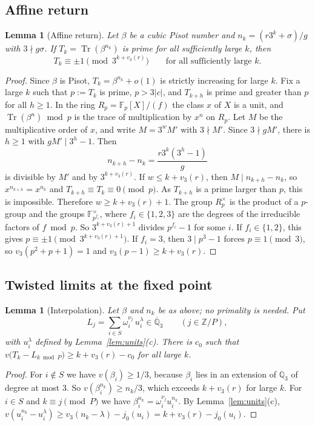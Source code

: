 \documentclass[11pt,a4paper]{article}
\newtheorem{lemma}[theorem]{Lemma}
\theoremstyle{definition}
\theoremstyle{remark}
\newcommand{\Z}{\mathbb{Z}}
\newcommand{\F}{\mathbb{F}}
\newcommand{\Qt}{\mathbb{Q}_3}
\newcommand{\Qtbar}{\overline{\mathbb{Q}}_3}
\DeclareMathOperator{\Tr}{Tr}
\begin{document}
\subsection{Affine return}
\begin{lemma}[Affine return]\label{lem:return}
Let $\beta$ be a cubic Pisot number and $n_k=(r3^k+\sigma)/g$ with $3\nmid g\sigma$.
If $T_k=\Tr(\beta^{n_k})$ is prime for all sufficiently large $k$, then
\[
 T_k\equiv\pm1\pmod{3^{k+v_3(r)}}\qquad\text{for all sufficiently large }k.
\]
\end{lemma}
\begin{proof}
Since $\beta$ is Pisot, $T_k=\beta^{n_k}+o(1)$ is strictly increasing for large $k$.
Fix a large $k$ such that $p:=T_k$ is prime, $p>3|c|$, and $T_{k+h}$ is prime and greater than $p$ for all $h\ge1$.
In the ring $R_p=\F_p[X]/(f)$ the class $x$ of $X$ is a unit, and $\Tr(\beta^n)\bmod p$ is the trace of multiplication by $x^n$ on $R_p$.
Let $M$ be the multiplicative order of $x$, and write $M=3^{w}M'$ with $3\nmid M'$.
Since $3\nmid gM'$, there is $h\ge1$ with $gM'\mid 3^h-1$. Then
\[
 n_{k+h}-n_k=\frac{r3^k(3^h-1)}{g}
\]
is divisible by $M'$ and by $3^{k+v_3(r)}$.
If $w\le k+v_3(r)$, then $M\mid n_{k+h}-n_k$, so $x^{n_{k+h}}=x^{n_k}$ and $T_{k+h}\equiv T_k\equiv0\pmod p$. As $T_{k+h}$ is a prime larger than $p$, this is impossible.
Therefore $w\ge k+v_3(r)+1$.
The group $R_p^\times$ is the product of a $p$-group and the groups $\F_{p^{f_i}}^\times$, where $f_i\in\{1,2,3\}$ are the degrees of the irreducible factors of $f\bmod p$. So $3^{k+v_3(r)+1}$ divides $p^{f_i}-1$ for some $i$.
If $f_i\in\{1,2\}$, this gives $p\equiv\pm1\pmod{3^{k+v_3(r)+1}}$.
If $f_i=3$, then $3\mid p^3-1$ forces $p\equiv1\pmod3$, so $v_3(p^2+p+1)=1$ and $v_3(p-1)\ge k+v_3(r)$.
\end{proof}

\subsection{Twisted limits at the fixed point}
\begin{lemma}[Interpolation]\label{lem:interp}
Let $\beta$ and $n_k$ be as above; no primality is needed. Put
\[
 L_j=\sum_{i\in S}\omega_i^{\nu_j}\,u_i^{\lambda}\in\Qtbar\qquad(j\in\Z/P),
\]
with $u_i^\lambda$ defined by Lemma~\ref{lem:units}(c). There is $c_0$ such that
$v\bigl(T_k-L_{k\bmod P}\bigr)\ge k+v_3(r)-c_0$ for all large $k$.
\end{lemma}
\begin{proof}
For $i\notin S$ we have $v(\beta_i)\ge1/3$, because $\beta_i$ lies in an extension of $\Qt$ of degree at most $3$. So $v(\beta_i^{n_k})\ge n_k/3$, which exceeds $k+v_3(r)$ for large $k$.
For $i\in S$ and $k\equiv j\pmod P$ we have $\beta_i^{n_k}=\omega_i^{\nu_j}u_i^{n_k}$. By Lemma~\ref{lem:units}(c), $v(u_i^{n_k}-u_i^{\lambda})\ge v_3(n_k-\lambda)-j_0(u_i)=k+v_3(r)-j_0(u_i)$.
\end{proof}
\end{document}
